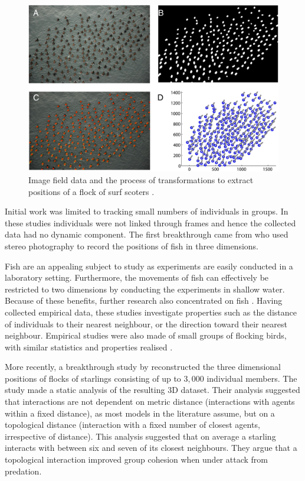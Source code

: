 \begin{figure}[!htbp]
	\includegraphics[width=\textwidth]{fig/lukeman_data.jpg}
	\caption{Image field data and the process of transformations to extract positions of a flock of surf scoters \citep{lukeman10}.}
	\label{fig:lukeman_data}
\end{figure}

Initial work was limited to tracking small numbers of individuals in groups. In these studies individuals were not linked through frames and hence the collected data had no dynamic component. The first breakthrough came from \citet{cullen65} who used stereo photography to record the positions of fish in three dimensions.

Fish are an appealing subject to study as experiments are easily conducted in a laboratory setting. Furthermore, the movements of fish can effectively be restricted to two dimensions by conducting the experiments in shallow water. Because of these benefits, further research also concentrated on fish \citep{van_long85, partridge80}. Having collected empirical data, these studies investigate properties such as the distance of individuals to their nearest neighbour, or the direction toward their nearest neighbour. Empirical studies were also made of small groups of flocking birds, with similar statistics and properties realised \citep{major78, budgey98}.

More recently, a breakthrough study by \citet{ballerini08} reconstructed the three dimensional positions of flocks of starlings consisting of up to $3,000$ individual members. The study made a static analysis of the resulting 3D dataset. Their analysis suggested that interactions are not dependent on metric distance (interactions with agents within a fixed distance), as most models in the literature assume, but on a topological distance (interaction with a fixed number of closest agents, irrespective of distance). This analysis suggested that on average a starling interacts with between six and seven of its closest neighbours. They argue that a topological interaction improved group cohesion when under attack from predation.

